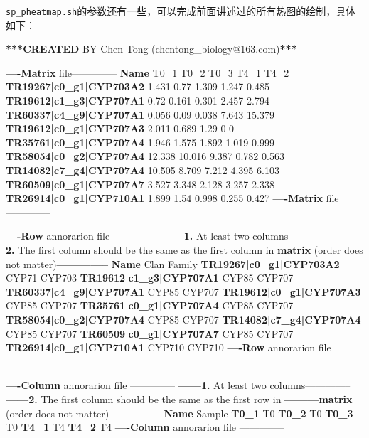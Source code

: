 \documentclass[]{article}
\newenvironment{Shaded}{\begin{snugshade}}{\end{snugshade}}
\newcommand{\KeywordTok}[1]{\textcolor[rgb]{0.13,0.29,0.53}{\textbf{{#1}}}}
\newcommand{\NormalTok}[1]{{#1}}
\numberwithin{figure}{section}
\numberwithin{table}{section}
\theoremstyle{definition}
\theoremstyle{definition}
\theoremstyle{definition}
\theoremstyle{remark}
\begin{document}
\texttt{sp\_pheatmap.sh}的参数还有一些，可以完成前面讲述过的所有热图的绘制，具体如下：

\begin{Shaded}
\begin{Highlighting}[]
\KeywordTok{***CREATED} \NormalTok{BY Chen Tong (chentong_biology@163.com)}\KeywordTok{***}

\KeywordTok{----Matrix} \NormalTok{file--------------}
\KeywordTok{Name}    \NormalTok{T0_1    T0_2    T0_3    T4_1    T4_2}
\KeywordTok{TR19267|c0_g1|CYP703A2}  \NormalTok{1.431   0.77    1.309   1.247   0.485}
\KeywordTok{TR19612|c1_g3|CYP707A1}  \NormalTok{0.72    0.161   0.301   2.457   2.794}
\KeywordTok{TR60337|c4_g9|CYP707A1}  \NormalTok{0.056   0.09    0.038   7.643   15.379}
\KeywordTok{TR19612|c0_g1|CYP707A3}  \NormalTok{2.011   0.689   1.29    0   0}
\KeywordTok{TR35761|c0_g1|CYP707A4}  \NormalTok{1.946   1.575   1.892   1.019   0.999}
\KeywordTok{TR58054|c0_g2|CYP707A4}  \NormalTok{12.338  10.016  9.387   0.782   0.563}
\KeywordTok{TR14082|c7_g4|CYP707A4}  \NormalTok{10.505  8.709   7.212   4.395   6.103}
\KeywordTok{TR60509|c0_g1|CYP707A7}  \NormalTok{3.527   3.348   2.128   3.257   2.338}
\KeywordTok{TR26914|c0_g1|CYP710A1}  \NormalTok{1.899   1.54    0.998   0.255   0.427}
\KeywordTok{----Matrix} \NormalTok{file--------------}

\KeywordTok{----Row} \NormalTok{annorarion file --------------}
\KeywordTok{------1.} \NormalTok{At least two columns--------------}
\KeywordTok{------2.} \NormalTok{The first column should be the same as the first column in}
         \KeywordTok{matrix} \NormalTok{(order does not matter)}\KeywordTok{--------------}
\KeywordTok{Name}    \NormalTok{Clan    Family}
\KeywordTok{TR19267|c0_g1|CYP703A2}  \NormalTok{CYP71   CYP703}
\KeywordTok{TR19612|c1_g3|CYP707A1}  \NormalTok{CYP85   CYP707}
\KeywordTok{TR60337|c4_g9|CYP707A1}  \NormalTok{CYP85   CYP707}
\KeywordTok{TR19612|c0_g1|CYP707A3}  \NormalTok{CYP85   CYP707}
\KeywordTok{TR35761|c0_g1|CYP707A4}  \NormalTok{CYP85   CYP707}
\KeywordTok{TR58054|c0_g2|CYP707A4}  \NormalTok{CYP85   CYP707}
\KeywordTok{TR14082|c7_g4|CYP707A4}  \NormalTok{CYP85   CYP707}
\KeywordTok{TR60509|c0_g1|CYP707A7}  \NormalTok{CYP85   CYP707}
\KeywordTok{TR26914|c0_g1|CYP710A1}  \NormalTok{CYP710  CYP710}
\KeywordTok{----Row} \NormalTok{annorarion file --------------}

\KeywordTok{----Column} \NormalTok{annorarion file --------------}
\KeywordTok{------1.} \NormalTok{At least two columns--------------}
\KeywordTok{------2.} \NormalTok{The first column should be the same as the first row in}
\KeywordTok{---------matrix} \NormalTok{(order does not matter)}\KeywordTok{--------------}
\KeywordTok{Name}    \NormalTok{Sample}
\KeywordTok{T0_1}    \NormalTok{T0}
\KeywordTok{T0_2}    \NormalTok{T0}
\KeywordTok{T0_3}    \NormalTok{T0}
\KeywordTok{T4_1}    \NormalTok{T4}
\KeywordTok{T4_2}    \NormalTok{T4}
\KeywordTok{----Column} \NormalTok{annorarion file --------------}



\end{Highlighting}
\end{Shaded}
\end{document}
